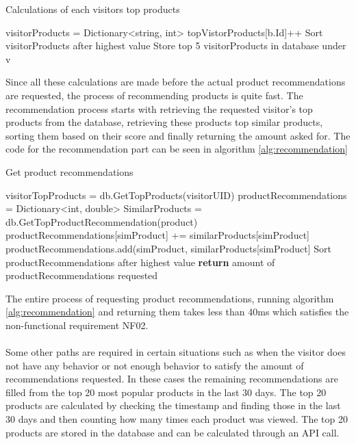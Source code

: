 \begin{algorithm}[H]
\caption{Calculations of each visitors top products}
\label{alg:topProducts}
\begin{algorithmic}[1]
\State visitorProducts = Dictionary<string, int>
\State topVistorProducts[b.Id]++
\EndFor
\State Sort visitorProducts after highest value
\State Store top 5 visitorProducts in database under v
\EndFor
\end{algorithmic}
\end{algorithm}

Since all these calculations are made before the actual product recommendations are requested, the process of recommending products is quite fast. The recommendation process starts with retrieving the requested visitor's top products from the database, retrieving these products top similar products, sorting them based on their score and finally returning the amount asked for. The code for the recommendation part can be seen in algorithm \ref{alg:recommendation}

\begin{algorithm}[H]
\caption{Get product recommendations}
\label{alg:recommendation}
\begin{algorithmic}[1]
\State visitorTopProducts = db.GetTopProducts(visitorUID)
\State productRecommendations = Dictionary<int, double>
\State SimilarProducts = db.GetTopProductRecommendation(product)
\State productRecommendations[simProduct] += similarProducts[simProduct]
\Else
\State productRecommendations.add(simProduct, similarProducts[simProduct]
\EndIf
\EndFor
\EndFor
\State Sort productRecommendations after highest value
\State \textbf{return} amount of productRecommendations requested
\State 
\end{algorithmic}
\end{algorithm}

The entire process of requesting product recommendations, running algorithm \ref{alg:recommendation} and returning them takes less than 40ms which satisfies the non-functional requirement NF02. \\\\
Some other paths are required in certain situations such as when the visitor does not have any behavior or not enough behavior to satisfy the amount of recommendations requested. In these cases the remaining recommendations are filled from the top 20 most popular products in the last 30 days. The top 20 products are calculated by checking the timestamp and finding those in the last 30 days and then counting how many times each product was viewed. The top 20 products are stored in the database and can be calculated through an API call.


